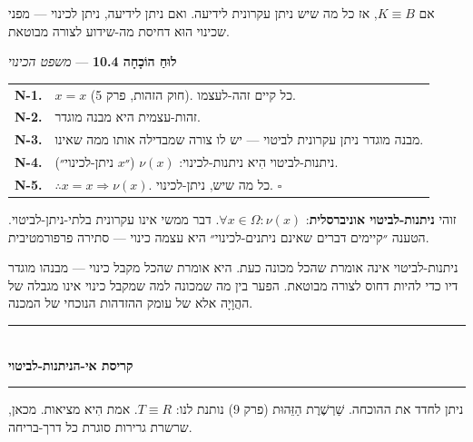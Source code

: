 \documentclass[10pt, openany, oneside]{book}
\renewcommand{\normalsize}{\fontsize{10}{13}\selectfont}
\renewcommand{\footnotesize}{\fontsize{8.5}{11}\selectfont}
\begin{document}
\vspace{1em}

\noindent אם $K \equiv B$, אז כל מה שיש ניתן עקרונית לידיעה. ואם ניתן לידיעה, ניתן לכינוי — מפני שכינוי הוּא דחיסת מה-שידוע לצורה מבוטאת.

\vspace{0.5em}

\textbf{לוּחַ הוֹכָחָה 10.4} --- \textit{משפט הכינוי}

\vspace{0.5em}

{\footnotesize
\noindent\begin{tabular}{r p{}}
\textbf{N-1.} & $x = x$ (חוק הזהות, פרק 5). כל קיים זהה-לעצמו. \\[0.3em]
\textbf{N-2.} & זהות-עצמית היא מבנה מוגדר. \\[0.3em]
\textbf{N-3.} & מבנה מוגדר ניתן עקרונית לביטוי — יש לו צורה שמבדילה אותו ממה שאינו. \\[0.3em]
\textbf{N-4.} & ניתנות-לביטוי הִיא ניתנות-לכינוי: $\nu(x)$ (״$x$ ניתן-לכינוי״). \\[0.3em]
\textbf{N-5.} & $\therefore x = x \Rightarrow \nu(x)$. כל מה שיש, ניתן-לכינוי. $\square$ \\[0.3em]
\end{tabular}
}

\vspace{0.8em}

\noindent זוהי \textbf{ניתנות-לביטוי אוניברסלית}: $\forall x \in \Omega: \nu(x)$. דבר ממשי אינו עקרונית בלתי-ניתן-לביטוי. הטענה ״קיימים דברים שאינם ניתנים-לכינוי״ היא עצמה כינוי — סתירה פרפורמטיבית.

ניתנות-לביטוי אינה אומרת שהכל מכונה כעת. היא אומרת שהכל מקבל כינוי — מבנהו מוגדר דיו כדי להיות דחוס לצורה מבוטאת. הפער בין מה שמכונה למה שמקבל כינוי אינו מגבלה של ההֲוָיָה אלא של עומק ההזדהות הנוכחי של המכנה.

\begin{center}
    \rule{0.3\textwidth}{0.4pt}\\[0.5em]
    {\normalsize\bfseries\textsc{קריסת אי-הניתנות-לביטוי}}\\[0.3em]
    \rule{0.3\textwidth}{0.4pt}
\end{center}

\vspace{1em}

\noindent ניתן לחדד את ההוכחה. שַׁרְשֶׁרֶת הַזֵּהוּת (פרק 9) נותנת לנו: $T \equiv R$. אמת הִיא מציאות. מכאן, שרשרת גרירות סוגרת כל דרך-בריחה.
\end{document}
